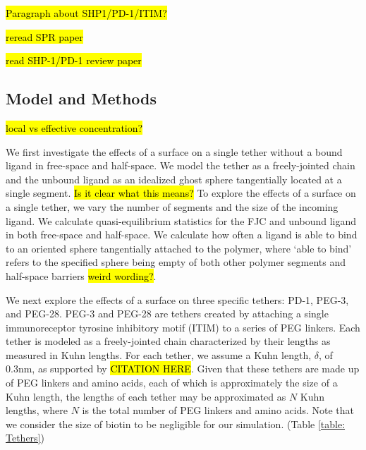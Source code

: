 \documentclass[../../AdvancementSummary.tex]{subfiles}
\begin{document}
\hl{Paragraph about SHP1/PD-1/ITIM?}

\hl{reread SPR paper} 

\hl{read SHP-1/PD-1 review paper}

\subsection{Model and Methods}

\hl{local vs effective concentration?}

We first investigate the effects of a surface on a single tether without a bound ligand in free-space and half-space. We model the tether as a freely-jointed chain and the unbound ligand as an idealized ghost sphere tangentially located at a single segment. \hl{Is it clear what this means?} To explore the effects of a surface on a single tether, we vary the number of segments and the size of the incoming ligand. We calculate quasi-equilibrium statistics for the FJC and unbound ligand in both free-space and half-space. We calculate how often a ligand is able to bind to an oriented sphere tangentially attached to the polymer, where `able to bind' refers to the specified sphere being empty of both other polymer segments and half-space barriers \hl{weird wording?}. 

We next explore the effects of a surface on three specific tethers: PD-1, PEG-3, and PEG-28.  PEG-3 and PEG-28 are tethers created by attaching a single immunoreceptor tyrosine inhibitory motif (ITIM) to a series of PEG linkers. Each tether is modeled as a freely-jointed chain characterized by their lengths as measured in Kuhn lengths.  For each tether, we assume a Kuhn length, $\delta$, of 0.3nm, as supported by \hl{CITATION HERE}. Given that these tethers are made up of PEG linkers and amino acids, each of which is approximately the size of a Kuhn length, the lengths of each tether may be approximated as $N$ Kuhn lengths, where $N$ is the total number of PEG linkers and amino acids. Note that we consider the size of biotin to be negligible for our simulation. (Table \ref{table: Tethers})
\end{document}
